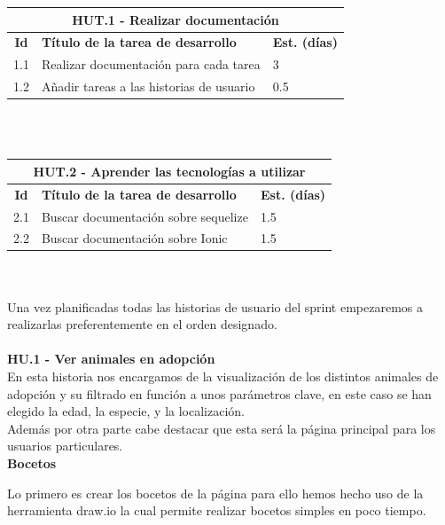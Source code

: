 \begin{tabular}{|c|p{9.5cm}|p{1cm}|}
	\hline
	\multicolumn{3}{|c|}{\textbf{HUT.1 - Realizar documentación}} \\
	\hline
	\textbf{Id} & \textbf{Título de la tarea de desarrollo} & \textbf{Est. (días)} \\
	\hline
	1.1 & Realizar documentación para cada tarea & 3 \\ \hline
	1.2 &  Añadir tareas a las historias de usuario & 0.5 \\ \hline
\end{tabular} \\ \\

\begin{tabular}{|c|p{9.5cm}|p{1cm}|}
	\hline
	\multicolumn{3}{|c|}{\textbf{HUT.2 - Aprender las tecnologías a utilizar}} \\
	\hline
	\textbf{Id} & \textbf{Título de la tarea de desarrollo} & \textbf{Est. (días)} \\
	\hline
	2.1 & Buscar documentación sobre sequelize & 1.5 \\ \hline
	2.2 & Buscar documentación sobre Ionic & 1.5 \\ \hline
\end{tabular} \\ \\


Una vez planificadas todas las historias de usuario del sprint empezaremos a realizarlas preferentemente en el orden designado. \\ \\

\Large{\textbf{HU.1 - Ver animales en adopción}} \\

En esta historia nos encargamos de la visualización de los distintos animales de adopción y su filtrado en función a unos parámetros clave, en este caso se han elegido la edad, la especie, y la localización. \\

Además por otra parte cabe destacar que esta será la página principal para los usuarios particulares. \\ 

\textbf{Bocetos}

Lo primero es crear los bocetos de la página para ello hemos hecho uso de la herramienta draw.io la cual permite realizar bocetos simples en poco tiempo.

